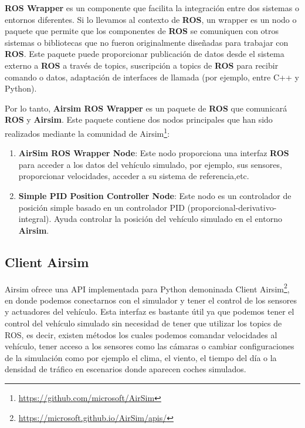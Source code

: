 \textbf{ROS Wrapper} es un componente que facilita la integración entre dos sistemas o entornos diferentes. Si lo llevamos al contexto de \textbf{ROS}, un wrapper es un nodo o paquete 
que permite que los componentes de \textbf{ROS} se comuniquen con otros sistemas o bibliotecas que no fueron originalmente diseñadas para trabajar con \textbf{ROS}. Este paquete 
puede proporcionar publicación de datos desde el sistema externo a \textbf{ROS} a través de topics, suscripción a topics de \textbf{ROS} para recibir comando o datos, adaptación 
de interfaces de llamada (por ejemplo, entre C++ y Python). 

Por lo tanto, \textbf{Airsim ROS Wrapper} es un paquete de \textbf{ROS} que comunicará \textbf{ROS} y \textbf{Airsim}. Este paquete contiene dos nodos principales 
que han sido realizados mediante la comunidad de Airsim\footnote{\url{https://github.com/microsoft/AirSim}}:
\begin{enumerate}
  \item \textbf{AirSim ROS Wrapper Node}: Este nodo proporciona una interfaz \textbf{ROS} para acceder a los datos del vehículo simulado, por ejemplo, sus sensores, proporcionar velocidades, acceder a su sistema de referencia,etc. 
  \item \textbf{Simple PID Position Controller Node}: Este nodo es un controlador de posición simple basado en un controlador PID (proporcional-derivativo-integral). Ayuda controlar la posición del vehículo 
  simulado en el entorno \textbf{Airsim}.
\end{enumerate}

\subsection{Client Airsim}
\label{sec:Client Airsim}

Airsim ofrece una API implementada para Python demoninada Client Airsim\footnote{\url{https://microsoft.github.io/AirSim/apis/}}, en donde podemos conectarnos con el simulador y tener el control de los sensores y actuadores del vehículo. 
Esta interfaz es bastante útil ya que podemos tener el control del vehículo simulado sin necesidad de tener que utilizar los topics de ROS, es decir, existen métodos los cuales
podemos comandar velocidades al vehículo, tener acceso a los sensores como las cámaras o cambiar configuraciones de la simulación como por ejemplo el clima, el viento, el tiempo del día
o la densidad de tráfico en escenarios donde aparecen coches simulados. 

